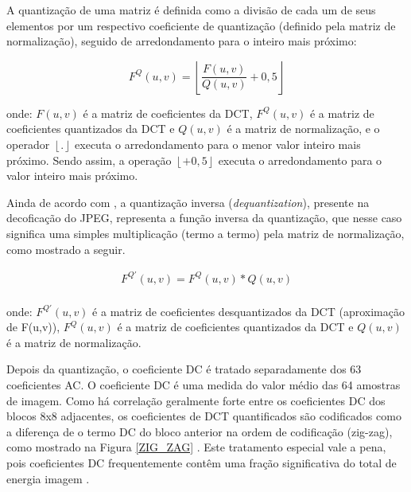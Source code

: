 A quantização de uma matriz é definida como a divisão de cada um de seus elementos por um respectivo coeficiente de quantização (definido pela matriz de normalização), seguido de arredondamento para o inteiro mais próximo:
\vspace{-3mm}
\begin{flushleft}
	\begin{equation}
		F^Q(u,v)=\left \lfloor \frac{F(u,v)}{Q(u,v)} +0,5 \right \rfloor
	\end{equation}
\end{flushleft}
onde:
			$F(u,v)$ é a matriz de coeficientes da DCT,
			$F^Q(u,v)$ é a matriz de coeficientes quantizados da DCT e
			$Q(u,v)$ é a matriz de normalização,
			e o operador $\left \lfloor . \right \rfloor$ executa o arredondamento para o menor valor inteiro mais próximo. Sendo assim, a operação $\left \lfloor  +0,5 \right \rfloor$ executa o arredondamento para o valor inteiro mais próximo.

			

Ainda de acordo com \cite{wallace1991jpeg}, a quantização inversa (\textit{dequantization}), presente na decoficação do JPEG, representa a função inversa da quantização, que nesse caso significa uma simples multiplicação (termo a termo) pela matriz de normalização, como mostrado a seguir.
\vspace{-5mm}
\begin{center}
	\begin{equation}
		\begin{split}
			F^{Q'}(u,v) =F^Q(u,v) * Q(u,v) \\
		\end{split}
	\end{equation}
\end{center} 
onde:
			$F^{Q'}(u,v)$ é a matriz de coeficientes desquantizados da DCT (aproximação de F(u,v)), 
			$F^Q(u,v)$ é a matriz de coeficientes quantizados da DCT e
			$Q(u,v)$ é a matriz de normalização.

Depois da quantização, o coeficiente DC é tratado separadamente dos 63 coeficientes AC. O coeficiente DC é uma medida do valor médio das 64 amostras de imagem. Como há correlação geralmente forte entre os coeficientes DC dos blocos 8x8 adjacentes, os coeficientes de DCT quantificados são codificados como a diferença de o termo DC do bloco anterior na ordem de codificação (zig-zag), como mostrado na Figura \ref{ZIG_ZAG} . Este tratamento especial vale a pena, pois coeficientes DC frequentemente contêm uma fração significativa do total de energia imagem \cite{wallace1991jpeg}.

